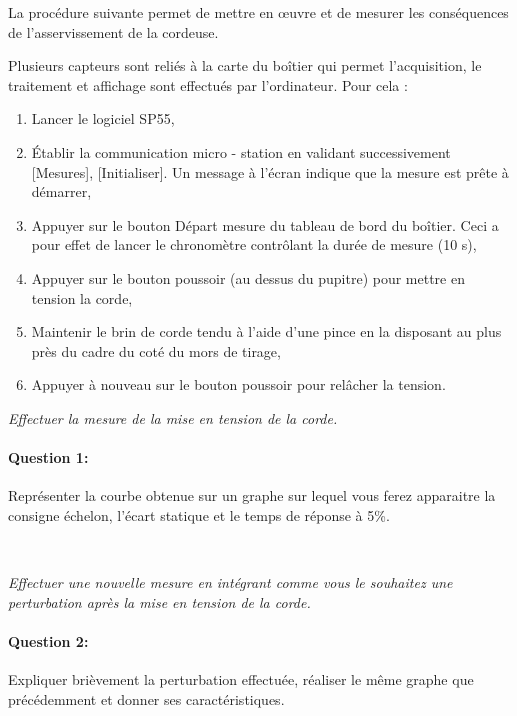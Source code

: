 

\ifdef{\public}{\cleardoublepage}{}



La procédure suivante permet de mettre en \oe uvre et de mesurer les conséquences de l'asservissement de la cordeuse.

Plusieurs capteurs sont reliés à la carte du boîtier qui permet l'acquisition, le traitement et affichage sont effectués par l'ordinateur. Pour cela :
\begin{enumerate}
 \item Lancer le logiciel SP55,
 \item Établir la communication micro - station en validant successivement [Mesures], [Initialiser]. Un message à l'écran indique que la mesure est prête à démarrer,
 \item Appuyer sur le bouton \og Départ mesure \fg du tableau de bord du boîtier. Ceci a pour effet de lancer le chronomètre contrôlant la durée de mesure (10 s),
 \item Appuyer sur le bouton poussoir (au dessus du pupitre) pour mettre en tension la corde,
 \item Maintenir le brin de corde tendu à l'aide d'une pince en la disposant au plus près du cadre du coté du mors de tirage,
 \item Appuyer à nouveau sur le bouton poussoir pour relâcher la tension.
\end{enumerate} 

\textit{Effectuer la mesure de la mise en tension de la corde.}

\paragraph{Question 1:} Représenter la courbe obtenue sur un graphe sur lequel vous ferez apparaitre la consigne échelon, l'écart statique et le temps de réponse à 5\%.

~\

\textit{Effectuer une nouvelle mesure en intégrant comme vous le souhaitez une perturbation après la mise en tension de la corde.}

\paragraph{Question 2:} Expliquer brièvement la perturbation effectuée, réaliser le même graphe que précédemment et donner ses caractéristiques.

